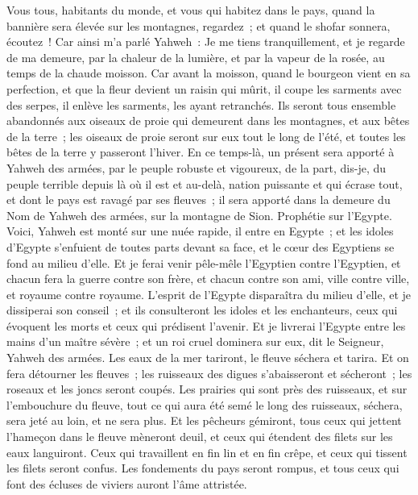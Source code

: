 \begin{multicols}{2}
Vous tous, habitants du monde, et vous qui habitez dans le pays, quand la bannière sera élevée sur les montagnes, regardez~; et quand le shofar sonnera, écoutez~!
Car ainsi m'a parlé Yahweh~: Je me tiens tranquillement, et je regarde de ma demeure, par la chaleur de la lumière, et par la vapeur de la rosée, au temps de la chaude moisson.
Car avant la moisson, quand le bourgeon vient en sa perfection, et que la fleur devient un raisin qui mûrit, il coupe les sarments avec des serpes, il enlève les sarments, les ayant retranchés.
Ils seront tous ensemble abandonnés aux oiseaux de proie qui demeurent dans les montagnes, et aux bêtes de la terre~; les oiseaux de proie seront sur eux tout le long de l'été, et toutes les bêtes de la terre y passeront l'hiver.
En ce temps-là, un présent sera apporté à Yahweh des armées, par le peuple robuste et vigoureux, de la part, dis-je, du peuple terrible depuis là où il est et au-delà, nation puissante et qui écrase tout, et dont le pays est ravagé par ses fleuves~; il sera apporté dans la demeure du Nom de Yahweh des armées, sur la montagne de Sion.
\VerseOne{}Prophétie sur l'Egypte. Voici, Yahweh est monté sur une nuée rapide, il entre en Egypte~; et les idoles d'Egypte s'enfuient de toutes parts devant sa face, et le cœur des Egyptiens se fond au milieu d'elle.
Et je ferai venir pêle-mêle l'Egyptien contre l'Egyptien, et chacun fera la guerre contre son frère, et chacun contre son ami, ville contre ville, et royaume contre royaume.
L'esprit de l'Egypte disparaîtra du milieu d'elle, et je dissiperai son conseil~; et ils consulteront les idoles et les enchanteurs, ceux qui évoquent les morts et ceux qui prédisent l'avenir.
Et je livrerai l'Egypte entre les mains d'un maître sévère~; et un roi cruel dominera sur eux, dit le Seigneur, Yahweh des armées.
Les eaux de la mer tariront, le fleuve séchera et tarira.
Et on fera détourner les fleuves~; les ruisseaux des digues s'abaisseront et sécheront~; les roseaux et les joncs seront coupés.
Les prairies qui sont près des ruisseaux, et sur l'embouchure du fleuve, tout ce qui aura été semé le long des ruisseaux, séchera, sera jeté au loin, et ne sera plus.
Et les pêcheurs gémiront, tous ceux qui jettent l'hameçon dans le fleuve mèneront deuil, et ceux qui étendent des filets sur les eaux languiront.
Ceux qui travaillent en fin lin et en fin crêpe, et ceux qui tissent les filets seront confus.
Les fondements du pays seront rompus, et tous ceux qui font des écluses de viviers auront l'âme attristée.

\end{multicols}
